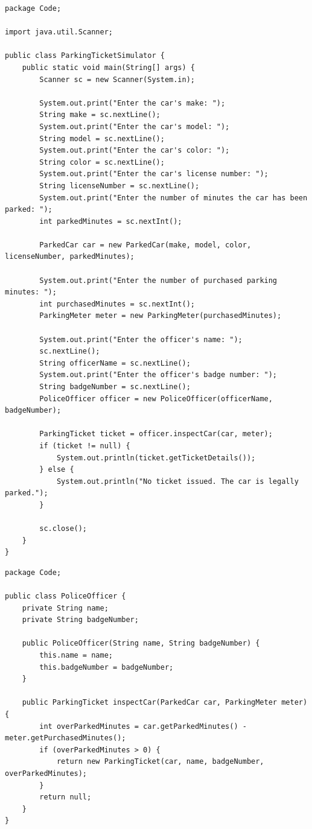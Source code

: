 \documentclass{article}
\begin{document}
\begin{lstlisting}[caption=ParkingTicketSimulator.java]
package Code;

import java.util.Scanner;

public class ParkingTicketSimulator {
    public static void main(String[] args) {
        Scanner sc = new Scanner(System.in);

        System.out.print("Enter the car's make: ");
        String make = sc.nextLine();
        System.out.print("Enter the car's model: ");
        String model = sc.nextLine();
        System.out.print("Enter the car's color: ");
        String color = sc.nextLine();
        System.out.print("Enter the car's license number: ");
        String licenseNumber = sc.nextLine();
        System.out.print("Enter the number of minutes the car has been parked: ");
        int parkedMinutes = sc.nextInt();

        ParkedCar car = new ParkedCar(make, model, color, licenseNumber, parkedMinutes);

        System.out.print("Enter the number of purchased parking minutes: ");
        int purchasedMinutes = sc.nextInt();
        ParkingMeter meter = new ParkingMeter(purchasedMinutes);

        System.out.print("Enter the officer's name: ");
        sc.nextLine();
        String officerName = sc.nextLine();
        System.out.print("Enter the officer's badge number: ");
        String badgeNumber = sc.nextLine();
        PoliceOfficer officer = new PoliceOfficer(officerName, badgeNumber);

        ParkingTicket ticket = officer.inspectCar(car, meter);
        if (ticket != null) {
            System.out.println(ticket.getTicketDetails());
        } else {
            System.out.println("No ticket issued. The car is legally parked.");
        }

        sc.close();
    }
}
\end{lstlisting}

\begin{lstlisting}[caption=PoliceOfficer.java]
package Code;

public class PoliceOfficer {
    private String name;
    private String badgeNumber;

    public PoliceOfficer(String name, String badgeNumber) {
        this.name = name;
        this.badgeNumber = badgeNumber;
    }

    public ParkingTicket inspectCar(ParkedCar car, ParkingMeter meter) {
        int overParkedMinutes = car.getParkedMinutes() - meter.getPurchasedMinutes();
        if (overParkedMinutes > 0) {
            return new ParkingTicket(car, name, badgeNumber, overParkedMinutes);
        }
        return null;
    }
}
\end{lstlisting}
\end{document}
